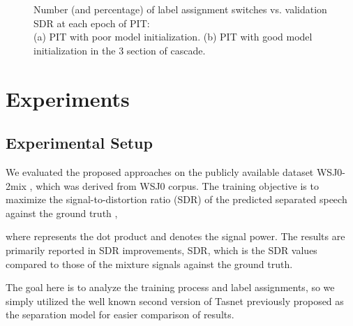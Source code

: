 \documentclass{article}
\begin{document}
\begin{figure*}
\centering
\vspace{-7pt}

\captionsetup{justification=centering}
\caption{Number (and percentage) of label assignment switches vs. validation SDR at each epoch of PIT:\\ (a) PIT with poor model initialization. (b) PIT with good model initialization in the 3 section of cascade.} 
\label{shift}
\vspace{-7pt}
\end{figure*}

\vspace{-7pt}
\section{Experiments}
\label{sec:pagestyle}
\vspace{-7pt}
\subsection{Experimental Setup} 

We evaluated the proposed approaches on the publicly available dataset WSJ0-2mix \cite{hershey2016deep}, which was derived from WSJ0 corpus. The training objective is to maximize the signal-to-distortion ratio (SDR)\cite{vincent2006performance} of the predicted separated speech  against the ground truth ,

where  represents the dot product and  denotes the signal power. The results are primarily reported in SDR improvements, SDR, which is the SDR values compared to those of the mixture signals against the ground truth.

The goal here is to analyze the training process and label assignments, so we simply utilized the well known second version of Tasnet\cite{luo2018tasnet} previously proposed as the separation model for easier comparison of results.

\vspace{-7pt}
\end{document}

